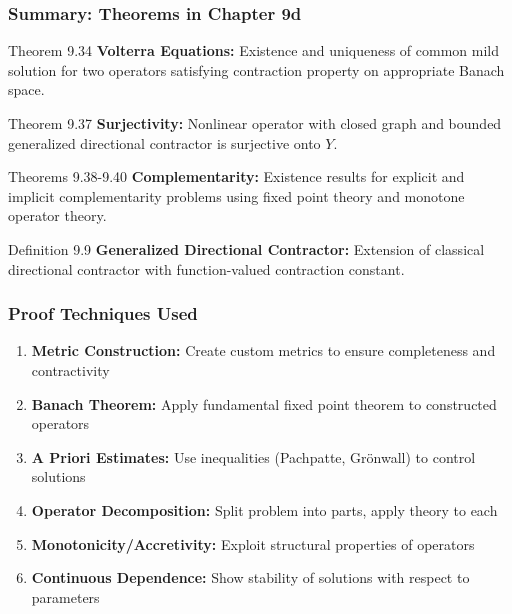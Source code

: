 \documentclass[aspectratio=169,10pt]{beamer}
\begin{document}
\begin{frame}[allowframebreaks]
    \frametitle{Summary: Theorems in Chapter 9d}

    \begin{block}{Theorem 9.34}
        \textbf{Volterra Equations:} Existence and uniqueness of common mild solution for two operators satisfying contraction property on appropriate Banach space.
    \end{block}

    \begin{block}{Theorem 9.37}
        \textbf{Surjectivity:} Nonlinear operator with closed graph and bounded generalized directional contractor is surjective onto $Y$.
    \end{block}

    \framebreak

    \begin{block}{Theorems 9.38-9.40}
        \textbf{Complementarity:} Existence results for explicit and implicit complementarity problems using fixed point theory and monotone operator theory.
    \end{block}

    \begin{block}{Definition 9.9}
        \textbf{Generalized Directional Contractor:} Extension of classical directional contractor with function-valued contraction constant.
    \end{block}
\end{frame}

\begin{frame}
    \frametitle{Proof Techniques Used}

    \begin{enumerate}
        \item \textbf{Metric Construction:} Create custom metrics to ensure completeness and contractivity

        \item \textbf{Banach Theorem:} Apply fundamental fixed point theorem to constructed operators

        \item \textbf{A Priori Estimates:} Use inequalities (Pachpatte, Grönwall) to control solutions

        \item \textbf{Operator Decomposition:} Split problem into parts, apply theory to each

        \item \textbf{Monotonicity/Accretivity:} Exploit structural properties of operators

        \item \textbf{Continuous Dependence:} Show stability of solutions with respect to parameters
    \end{enumerate}
\end{frame}
\end{document}
